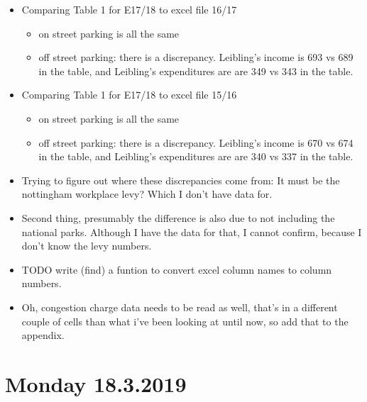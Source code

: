 \documentclass[]{article}
\providecommand{\tightlist}{%
  \setlength{\itemsep}{0pt}\setlength{\parskip}{0pt}}
\begin{document}
\begin{itemize}
\item
  Comparing Table 1 for E17/18 to excel file 16/17

  \begin{itemize}
  \tightlist
  \item
    on street parking is all the same
  \item
    off street parking: there is a discrepancy. Leibling's income is 693
    vs 689 in the table, and Leibling's expenditures are are 349 vs 343
    in the table.
  \end{itemize}
\item
  Comparing Table 1 for E17/18 to excel file 15/16

  \begin{itemize}
  \tightlist
  \item
    on street parking is all the same
  \item
    off street parking: there is a discrepancy. Leibling's income is 670
    vs 674 in the table, and Leibling's expenditures are are 340 vs 337
    in the table.
  \end{itemize}
\item
  Trying to figure out where these discrepancies come from: It must be
  the nottingham workplace levy? Which I don't have data for.
\item
  Second thing, presumably the difference is also due to not including
  the national parks. Although I have the data for that, I cannot
  confirm, because I don't know the levy numbers.
\item
  TODO write (find) a funtion to convert excel column names to column
  numbers.
\item
  Oh, congestion charge data needs to be read as well, that's in a
  different couple of cells than what i've been looking at until now, so
  add that to the appendix.
\end{itemize}

\hypertarget{monday-18.3.2019}{%
\section{Monday 18.3.2019}\label{monday-18.3.2019}}
\end{document}
